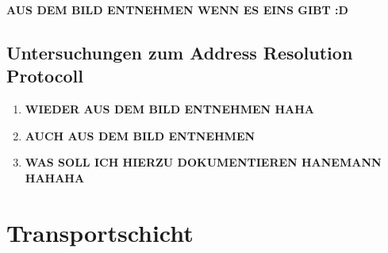\documentclass{scrartcl}
\begin{document}
  \textbf{AUS DEM BILD ENTNEHMEN WENN ES EINS GIBT :D}
  
  \subsection{Untersuchungen zum Address Resolution Protocoll}
  
  \renewcommand{\labelenumi}{\alph{enumi})}
  \begin{enumerate}
  \item
  \textbf{WIEDER AUS DEM BILD ENTNEHMEN HAHA}
  
  \item
  \textbf{AUCH AUS DEM BILD ENTNEHMEN}
  
  \item
  \textbf{WAS SOLL ICH HIERZU DOKUMENTIEREN HANEMANN HAHAHA}
  \end{enumerate}    





  \newpage
\section[Versuch 6 Transportschicht]{Transportschicht}
  
  
  
  
  
  
  
  
  
  
  
\end{document}

